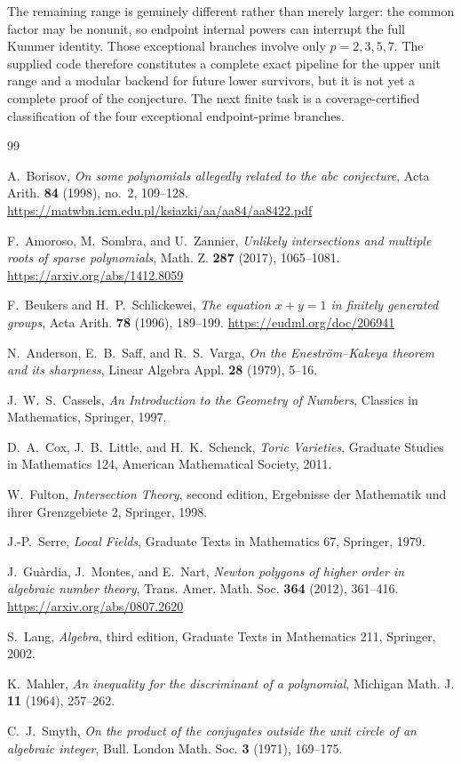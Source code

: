 \documentclass[11pt]{article}
\theoremstyle{definition}
\begin{document}
The remaining range is genuinely different rather than merely larger: the
common factor may be nonunit, so endpoint internal powers can interrupt the
full Kummer identity.  Those exceptional branches involve only
\(p=2,3,5,7\).  The supplied code therefore constitutes a complete exact
pipeline for the upper unit range and a modular backend for future lower
survivors, but it is not yet a complete proof of the conjecture.  The next
finite task is a coverage-certified classification of the four exceptional
endpoint-prime branches.

\begin{thebibliography}{99}

A.~Borisov,
\emph{On some polynomials allegedly related to the abc conjecture},
Acta Arith. \textbf{84} (1998), no.~2, 109--128.
\url{https://matwbn.icm.edu.pl/ksiazki/aa/aa84/aa8422.pdf}


F.~Amoroso, M.~Sombra, and U.~Zannier,
\emph{Unlikely intersections and multiple roots of sparse polynomials},
Math. Z. \textbf{287} (2017), 1065--1081.
\url{https://arxiv.org/abs/1412.8059}

F.~Beukers and H.~P.~Schlickewei,
\emph{The equation \(x+y=1\) in finitely generated groups},
Acta Arith. \textbf{78} (1996), 189--199.
\url{https://eudml.org/doc/206941}

N.~Anderson, E.~B.~Saff, and R.~S.~Varga,
\emph{On the Enestr\"om--Kakeya theorem and its sharpness},
Linear Algebra Appl. \textbf{28} (1979), 5--16.

J.~W.~S.~Cassels,
\emph{An Introduction to the Geometry of Numbers},
Classics in Mathematics, Springer, 1997.

D.~A.~Cox, J.~B.~Little, and H.~K.~Schenck,
\emph{Toric Varieties},
Graduate Studies in Mathematics 124, American Mathematical Society, 2011.

W.~Fulton,
\emph{Intersection Theory}, second edition,
Ergebnisse der Mathematik und ihrer Grenzgebiete 2,
Springer, 1998.

J.-P.~Serre,
\emph{Local Fields},
Graduate Texts in Mathematics 67, Springer, 1979.

J.~Gu\`ardia, J.~Montes, and E.~Nart,
\emph{Newton polygons of higher order in algebraic number theory},
Trans. Amer. Math. Soc. \textbf{364} (2012), 361--416.
\url{https://arxiv.org/abs/0807.2620}

S.~Lang,
\emph{Algebra}, third edition,
Graduate Texts in Mathematics 211, Springer, 2002.

K.~Mahler,
\emph{An inequality for the discriminant of a polynomial},
Michigan Math. J. \textbf{11} (1964), 257--262.

C.~J.~Smyth,
\emph{On the product of the conjugates outside the unit circle of an
algebraic integer},
Bull. London Math. Soc. \textbf{3} (1971), 169--175.

\end{thebibliography}
\end{document}
